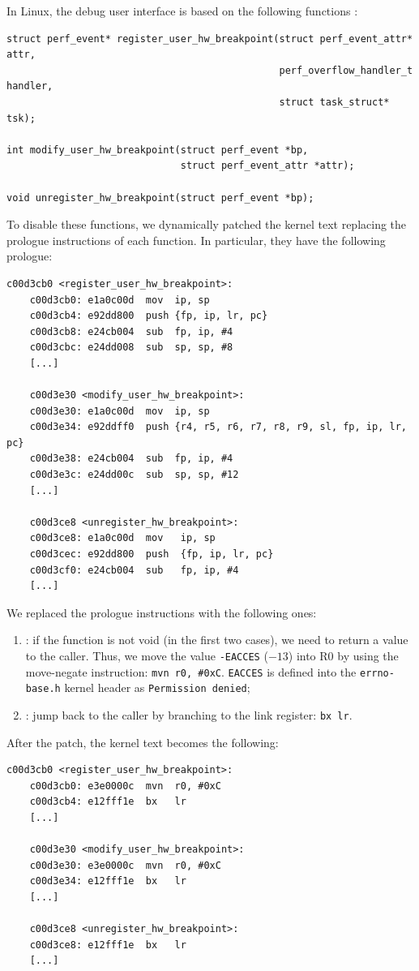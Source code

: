 In Linux, the debug user interface is based on the following functions \cite{hw-breakpoint}:
\begin{lstlisting}
struct perf_event* register_user_hw_breakpoint(struct perf_event_attr* attr,
                                               perf_overflow_handler_t handler,
                                               struct task_struct* tsk);

int modify_user_hw_breakpoint(struct perf_event *bp,
                              struct perf_event_attr *attr);

void unregister_hw_breakpoint(struct perf_event *bp);
\end{lstlisting}
To disable these functions, we dynamically patched the kernel text replacing the prologue instructions of each function.
In particular, they have the following prologue:
\begin{Verbatim}[fontsize=\small]
	c00d3cb0 <register_user_hw_breakpoint>:
	c00d3cb0: e1a0c00d  mov  ip, sp
	c00d3cb4: e92dd800  push {fp, ip, lr, pc}
	c00d3cb8: e24cb004  sub  fp, ip, #4
	c00d3cbc: e24dd008  sub  sp, sp, #8
	[...]

	c00d3e30 <modify_user_hw_breakpoint>:                                
	c00d3e30: e1a0c00d  mov  ip, sp
	c00d3e34: e92ddff0  push {r4, r5, r6, r7, r8, r9, sl, fp, ip, lr, pc}
	c00d3e38: e24cb004  sub  fp, ip, #4
	c00d3e3c: e24dd00c  sub  sp, sp, #12
	[...]

	c00d3ce8 <unregister_hw_breakpoint>:
	c00d3ce8: e1a0c00d  mov   ip, sp
	c00d3cec: e92dd800  push  {fp, ip, lr, pc}
	c00d3cf0: e24cb004  sub   fp, ip, #4
	[...]
\end{Verbatim}
We replaced the prologue instructions with the following ones:
\begin{enumerate}
	\item {}: if the function is not void (\eg in the first two cases), we need to return a value to the caller.
		Thus, we move the value \verb|-EACCES| ($-13$) into R0 by using the move-negate instruction: \verb|mvn r0, #0xC|.
		\verb|EACCES| is defined into the \verb|errno-base.h| kernel header as \verb|Permission denied|;
	\item {}: jump back to the caller by branching to the link register: \verb|bx lr|.
\end{enumerate}
After the patch, the kernel text becomes the following:
\begin{Verbatim}[fontsize=\small]
	c00d3cb0 <register_user_hw_breakpoint>:
	c00d3cb0: e3e0000c  mvn  r0, #0xC
	c00d3cb4: e12fff1e  bx   lr
	[...]

	c00d3e30 <modify_user_hw_breakpoint>:                                
	c00d3e30: e3e0000c  mvn  r0, #0xC
	c00d3e34: e12fff1e  bx   lr
	[...]

	c00d3ce8 <unregister_hw_breakpoint>:
	c00d3ce8: e12fff1e  bx   lr
	[...]
\end{Verbatim}

